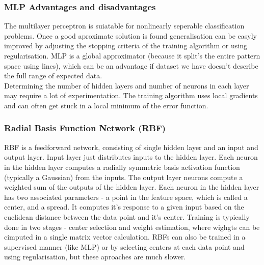 \documentclass[a4paper, 11pt]{article}
\begin{document}
\subsubsection*{MLP Advantages and disadvantages}
The multilayer perceptron is suiatable for nonlinearly seperable classification problems. Once a good aproximate solution is found generalisation can be easyly improved by adjusting the stopping criteria of the training algorithm or using regularisation. MLP is a global approximator (because it split's the entire pattern space using lines), which can be an advantage if dataset we have doesn't describe the full range of expected data. \\ 
Determining the number of hidden layers and number of neurons in each layer may require a lot of experimentation. The training algorithm uses local gradients and can often get stuck in a local minimum of the error function. 


\subsubsection*{Radial Basis Function Network (RBF)}
RBF is a feedforward network, consisting of single hidden layer and an input and output layer. Input layer just distributes inputs to the hidden layer. Each neuron in the hidden layer computes a radially symmetric basis activation function (typically a Gaussian) from the inputs. The output layer neurons compute a weighted sum of the outputs of the hidden layer. Each neuron in the hidden layer has two associated parameters - a point in the feature space, which is called a center, and a spread. It computes it's response to a given input based on the euclidean distance between the data point and it's center. Training is typically done in two stages - center selection and weight estimation, where wighgts can be cimputed in a single matrix vector calculation. RBFs can also be trained in a supervised manner (like MLP) or by selecting centers at each data point and using regularisation, but these aproaches are much slower.
\end{document}
